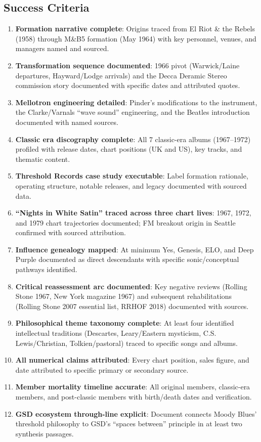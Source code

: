 \documentclass[11pt,letterpaper]{article}
\begin{document}
\subsection{Success Criteria}

\begin{enumerate}[leftmargin=*, labelsep=1em]
  \item \textbf{Formation narrative complete}: Origins traced from El Riot \& the Rebels (1958) through M\&B5 formation (May 1964) with key personnel, venues, and managers named and sourced.
  \item \textbf{Transformation sequence documented}: 1966 pivot (Warwick/Laine departures, Hayward/Lodge arrivals) and the Decca Deramic Stereo commission story documented with specific dates and attributed quotes.
  \item \textbf{Mellotron engineering detailed}: Pinder's modifications to the instrument, the Clarke/Varnals ``wave sound'' engineering, and the Beatles introduction documented with named sources.
  \item \textbf{Classic era discography complete}: All 7 classic-era albums (1967--1972) profiled with release dates, chart positions (UK and US), key tracks, and thematic content.
  \item \textbf{Threshold Records case study executable}: Label formation rationale, operating structure, notable releases, and legacy documented with sourced data.
  \item \textbf{``Nights in White Satin'' traced across three chart lives}: 1967, 1972, and 1979 chart trajectories documented; FM breakout origin in Seattle confirmed with sourced attribution.
  \item \textbf{Influence genealogy mapped}: At minimum Yes, Genesis, ELO, and Deep Purple documented as direct descendants with specific sonic/conceptual pathways identified.
  \item \textbf{Critical reassessment arc documented}: Key negative reviews (Rolling Stone 1967, New York magazine 1967) and subsequent rehabilitations (Rolling Stone 2007 essential list, RRHOF 2018) documented with sources.
  \item \textbf{Philosophical theme taxonomy complete}: At least four identified intellectual traditions (Descartes, Leary/Eastern mysticism, C.S. Lewis/Christian, Tolkien/pastoral) traced to specific songs and albums.
  \item \textbf{All numerical claims attributed}: Every chart position, sales figure, and date attributed to specific primary or secondary source.
  \item \textbf{Member mortality timeline accurate}: All original members, classic-era members, and post-classic members with birth/death dates and verification.
  \item \textbf{GSD ecosystem through-line explicit}: Document connects Moody Blues' threshold philosophy to GSD's ``spaces between'' principle in at least two synthesis passages.
\end{enumerate}
\end{document}
